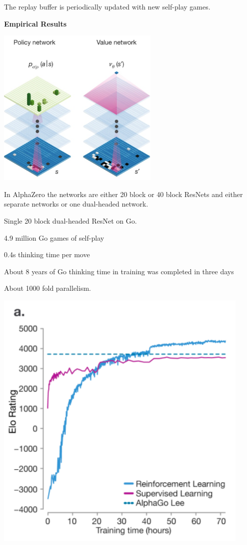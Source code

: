 {\vfill
The replay buffer is periodically updated with new self-play games.

\slide{}

\centerline{\bf Empirical Results}
 \vfill


\centerline{\includegraphics[height=3.0in]{../images/alphagoArchitecture2}}

\vfill
In AlphaZero the networks are either 20 block or 40 block ResNets and either separate networks or one dual-headed network.


Single 20 block dual-headed ResNet on Go.

\vfill
4.9 million Go games of self-play

\vfill
0.4s thinking time per move

\vfill
About 8 years of Go thinking time in training was completed in three days

\vfill
About 1000 fold parallelism.


\centerline{\includegraphics[height = 5in]{../images/alphalearning1}}

}

